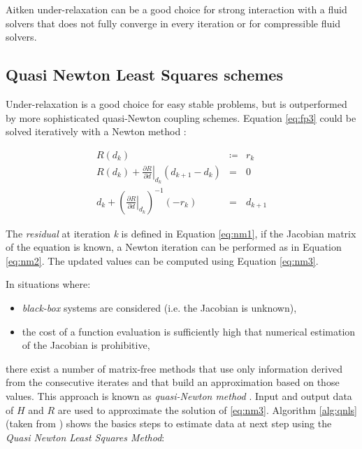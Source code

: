 Aitken under-relaxation can be a good choice for strong interaction with a fluid solvers that does not fully converge in every iteration or for compressible fluid solvers.


\subsection{Quasi Newton Least Squares schemes}

Under-relaxation is a good choice for easy stable problems, but is outperformed by more sophisticated quasi-Newton coupling schemes. Equation \ref{eq:fp3} could be solved iteratively with a Newton method \cite{uekermann2016partitioned}:

\begin{subequations}
	\begin{eqnarray}
		\label{eq:nm1}
		R(d_k) &\coloneqq&  r_k  \\
		\label{eq:nm2}
		R(d_k) + \left. \frac{\partial R}{\partial d}\right|_{d_k} \left( d_{k+1} - d_k \right) &=& 0 \\
		\label{eq:nm3}
		d_k + \left(  \left. \frac{\partial R}{\partial d} \right|_{d_k} \right)^{-1} \left(-r_k \right) &=&  d_{k+1}
	\end{eqnarray} 
	\label{eq:fp-jac}
\end{subequations}

The \textit{residual} at iteration \textit{k} is defined in Equation \ref{eq:nm1}, if the Jacobian matrix of the equation is known, a Newton iteration can be performed as in Equation \ref{eq:nm2}. The updated values can be computed using Equation \ref{eq:nm3}.

In situations where:
\begin{itemize}
	\item \textit{black-box} systems are considered (i.e. the Jacobian is unknown),
	\item the cost of a function evaluation is sufficiently high that numerical estimation of the Jacobian is prohibitive, 
\end{itemize}

there exist a number of matrix-free methods that use only information derived from the consecutive iterates and that build an approximation based on those values. This approach is known as \textit{quasi-Newton method} \cite{haelterman2009quasi}.
Input and output data of $H$ and $R$ are used to approximate the solution of \ref{eq:nm3}. Algorithm \ref{alg:qnls} (taken from \cite{uekermann2013parallel}) shows the basics steps to estimate data at next step using the \textit{Quasi Newton Least Squares Method}:

